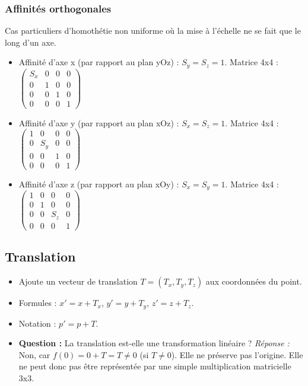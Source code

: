 \documentclass{article}
\begin{document}
\subsubsection{Affinités orthogonales}
Cas particuliers d'homothétie non uniforme où la mise à l'échelle ne se fait que le long d'un axe.
\begin{itemize}
    \item Affinité d'axe x (par rapport au plan yOz) : $S_y=S_z=1$. Matrice 4x4 : $\begin{pmatrix} S_x & 0 & 0 & 0 \\ 0 & 1 & 0 & 0 \\ 0 & 0 & 1 & 0 \\ 0 & 0 & 0 & 1 \end{pmatrix}$
    \item Affinité d'axe y (par rapport au plan xOz) : $S_x=S_z=1$. Matrice 4x4 : $\begin{pmatrix} 1 & 0 & 0 & 0 \\ 0 & S_y & 0 & 0 \\ 0 & 0 & 1 & 0 \\ 0 & 0 & 0 & 1 \end{pmatrix}$
    \item Affinité d'axe z (par rapport au plan xOy) : $S_x=S_y=1$. Matrice 4x4 : $\begin{pmatrix} 1 & 0 & 0 & 0 \\ 0 & 1 & 0 & 0 \\ 0 & 0 & S_z & 0 \\ 0 & 0 & 0 & 1 \end{pmatrix}$
\end{itemize}

\subsection{Translation}

\begin{itemize}
    \item Ajoute un vecteur de translation $T = (T_x, T_y, T_z)$ aux coordonnées du point.
    \item Formules : $x' = x + T_x$, $y' = y + T_y$, $z' = z + T_z$.
    \item Notation : $p' = p + T$.
    \item \textbf{Question :} La translation est-elle une transformation linéaire ?
        \textit{Réponse :} Non, car $f(0) = 0 + T = T \neq 0$ (si $T \neq 0$). Elle ne préserve pas l'origine. Elle ne peut donc pas être représentée par une simple multiplication matricielle 3x3.
\end{itemize}
\end{document}
